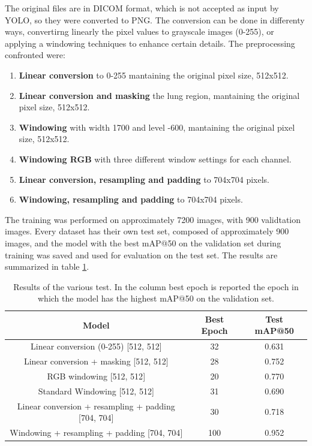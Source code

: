The original files are in DICOM format, which is not accepted as input by YOLO, so they were converted to PNG. The conversion can be done in differenty ways, convertirng linearly the pixel values to grayscale images (0-255), or applying a windowing techniques to enhance certain details. 
The preprocessing confronted were: 
\begin{enumerate}
    \item \textbf{Linear conversion} to 0-255 mantaining the original pixel size, 512x512.
    \item \textbf{Linear conversion and masking} the lung region, mantaining the original pixel size, 512x512.
    \item \textbf{Windowing} with width 1700 and level -600, mantaining the original pixel size, 512x512.
    \item \textbf{Windowing RGB} with three different window settings for each channel.
    \item \textbf{Linear conversion, resampling and padding} to 704x704 pixels.
    \item \textbf{Windowing, resampling and padding} to 704x704 pixels.
\end{enumerate}
The training was performed on approximately 7200 images, with 900 validtation images.
Every dataset has their own test set, composed of approximately 900 images, and the model with the best mAP@50 on the validation set during training was saved and used for evaluation on the test set. The results are summarized in table \ref{tab:medical_results}.

    \begin{table}[]
        \caption{Results of the various test. In the column best epoch is reported the epoch in which the model has the highest mAP@50 on the validation set.}
        \label{tab:medical_results}
        \begin{tabular}{|c|c|c|}
        \hline
        \textbf{Model}                                          & \textbf{Best Epoch} & \textbf{Test mAP@50} \\ \hline
        Linear conversion (0-255) {[}512, 512{]}                & 32                  & 0.631                \\
        Linear conversion + masking {[}512, 512{]}              & 28                  & 0.752                \\
        RGB windowing  {[}512, 512{]}                           & 20                  & 0.770                \\
        Standard Windowing {[}512, 512{]}                       & 31                  & 0.690                \\
        Linear conversion + resampling + padding {[}704, 704{]} & 30                  & 0.718                \\
        Windowing + resampling + padding  {[}704, 704{]}        & 100                 & 0.952                \\ \hline
        \end{tabular}
        \end{table}

